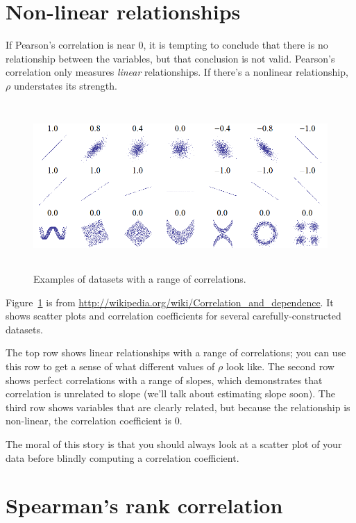 \documentclass[12pt]{book}
\begin{document}
\section{Non-linear relationships}

If Pearson's correlation is near 0, it is tempting to conclude
that there is no relationship between the variables, but that
conclusion is not valid.  Pearson's correlation only measures {\em
  linear} relationships.  If there's a nonlinear relationship, $\rho$
understates its strength.  

\begin{figure}
\centerline{\includegraphics[height=2.5in]{figs/Correlation_examples.png}}
\caption{Examples of datasets with a range of correlations.}
\label{corr_examples}
\end{figure}

Figure~\ref{corr_examples} is from
\url{http://wikipedia.org/wiki/Correlation_and_dependence}.  It shows
scatter plots and correlation coefficients for several
carefully-constructed datasets.

The top row shows linear relationships with a range of correlations;
you can use this row to get a sense of what different values of
$\rho$ look like.  The second row shows perfect correlations with a
range of slopes, which demonstrates that correlation is unrelated to
slope (we'll talk about estimating slope soon).  The third row shows
variables that are clearly related, but because the relationship is
non-linear, the correlation coefficient is 0.

The moral of this story is that you should always look at a scatter
plot of your data before blindly computing a correlation coefficient.
 


\section{Spearman's rank correlation}
\end{document}
